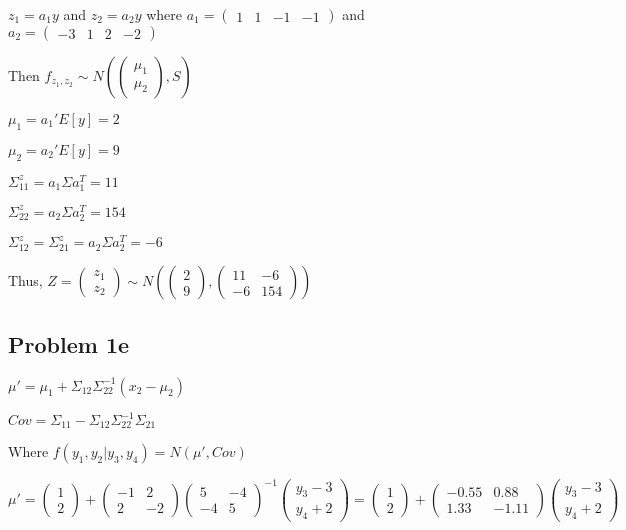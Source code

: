 \documentclass[a4paper]{article}
\begin{document}
$z_1=a_1y$ and $z_2 = a_2y$ where $a_1 = \begin{pmatrix}1 & 1 & -1 & -1 \end{pmatrix}$
and $a_2 = \begin{pmatrix}-3 & 1 & 2 & -2 \end{pmatrix}$

Then $f_{z_1,z_2} \sim N(\begin{pmatrix} \mu_1 \\ \mu_2 \end{pmatrix}, S)$

$\mu_1 = a_1'E[y] = 2$

$\mu_2 = a_2'E[y] = 9$

$\Sigma^z_{11} = a_1\Sigma a_1^T = 11$

$\Sigma^z_{22} = a_2\Sigma a_2^T = 154$

$\Sigma^z_{12} =  \Sigma^z_{21} =  a_2\Sigma a_2^T = -6$


Thus, $Z = \begin{pmatrix} z_1 \\ z_2 \end{pmatrix}
\sim N(\begin{pmatrix} 2\\ 9\end{pmatrix}, \begin{pmatrix} 11 & -6\\ 
-6 & 154\end{pmatrix})$ 

\subsection*{Problem 1e}

$\mu' = \mu_1 + \Sigma_{12}\Sigma_{22}^{-1}(x_2-\mu_2)$

$Cov = \Sigma_{11} - \Sigma_{12}\Sigma_{22}^{-1}\Sigma_{21}$

Where $f(y_1, y_2 |y_3, y_4) = N(\mu', Cov)$

$\mu' = \begin{pmatrix}1 \\ 2 \end{pmatrix} + \begin{pmatrix} -1 & 2\\ 2 & -2 \end{pmatrix} \begin{pmatrix} 5 & -4\\ -4 & 5\end{pmatrix}^{-1} \begin{pmatrix}y_3-3\\ y_4+2\end{pmatrix} = \begin{pmatrix}1 \\ 2 \end{pmatrix} + \begin{pmatrix} -0.55 & 0.88\\ 1.33 & -1.11 \end{pmatrix} \begin{pmatrix}y_3-3\\ y_4+2\end{pmatrix}$
\end{document}
